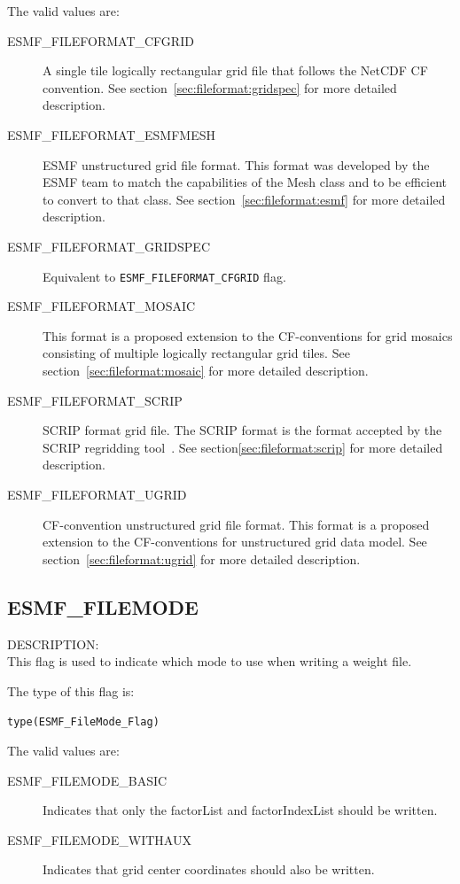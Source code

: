 The valid values are:
\begin{description}
\item [ESMF\_FILEFORMAT\_CFGRID]  A single tile logically rectangular
  grid file that follows the NetCDF CF convention. See section~\ref{sec:fileformat:gridspec} for more detailed description.

\item [ESMF\_FILEFORMAT\_ESMFMESH] ESMF unstructured grid file format. This format was developed by the ESMF team to match the capabilities of the Mesh class and to be efficient to convert to that class. See section~\ref{sec:fileformat:esmf} for more detailed description.

\item [ESMF\_FILEFORMAT\_GRIDSPEC]  Equivalent to {\tt ESMF\_FILEFORMAT\_CFGRID} flag.  

\item [ESMF\_FILEFORMAT\_MOSAIC] This format is a proposed extension to the 
CF-conventions for grid mosaics consisting of multiple logically rectangular grid
tiles. See section~\ref{sec:fileformat:mosaic} for more detailed description.

\item [ESMF\_FILEFORMAT\_SCRIP] SCRIP format grid file. The SCRIP format is
  the format accepted by the SCRIP regridding tool~\cite{ref:SCRIP}.  See section\ref{sec:fileformat:scrip} for more detailed description.

\item [ESMF\_FILEFORMAT\_UGRID] CF-convention unstructured grid file format. This format is a proposed extension to the 
CF-conventions for unstructured grid data model. See section~\ref{sec:fileformat:ugrid} for more detailed description.

\end{description}

\subsection{ESMF\_FILEMODE}
\label{const:filemodeflag}
{\sf DESCRIPTION:\\}
This flag is used to indicate which mode to use when writing a weight file.

The type of this flag is:

{\tt type(ESMF\_FileMode\_Flag)}

The valid values are:
\begin{description}
\item [ESMF\_FILEMODE\_BASIC]
      Indicates that only the factorList and factorIndexList should be written.
\item [ESMF\_FILEMODE\_WITHAUX]
      Indicates that grid center coordinates should also be written.

\end{description}

